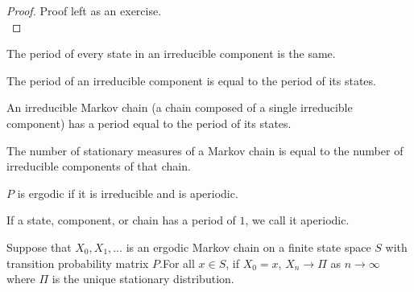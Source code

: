 \documentclass[english, course]{Notes}
\begin{document}
\begin{proof}
Proof left as an exercise.\\
\end{proof}

\begin{corollary}
The period of every state in an irreducible component is the same.\\
\end{corollary}

\begin{definition}
The period of an irreducible component is equal to the period of its states.\\
\end{definition}

\begin{definition}
An irreducible Markov chain (a chain composed of a single irreducible component) has a period equal to the period of its states.\\
\end{definition}

\begin{fact}
The number of stationary measures of a Markov chain is equal to the number of irreducible components of that chain.\\
\end{fact}

\begin{definition}
$P$ is ergodic if it is irreducible and is aperiodic.\\
\end{definition}

\begin{definition}
If a state, component, or chain has a period of $1$, we call it aperiodic.\\
\end{definition}

\begin{theorem}
Suppose that $X_0, X_1, \dots$ is an ergodic Markov chain on a finite state space $S$ with transition probability matrix $P$.For all $x \in S$, if $X_0 = x$, $X_n \to \Pi$ as $n \to \infty$ where $\Pi$ is the unique stationary distribution.
\end{theorem}
\end{document}
